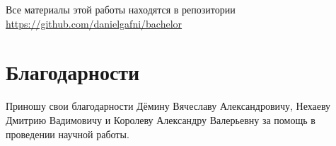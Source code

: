 \documentclass[a4paper]{article}
\begin{document}
\begin{center}
Все материалы этой работы находятся в репозитории\\
\href{https://github.com/danielgafni/bachelor}{https://github.com/danielgafni/bachelor} 
\end{center}

\clearpage 


\section{Благодарности}
Приношу свои благодарности Дёмину Вячеславу Александровичу, Нехаеву Дмитрию Вадимовичу и Королеву Александру Валерьевну за помощь в проведении научной работы.

\clearpage

\printbibliography
\end{document}
